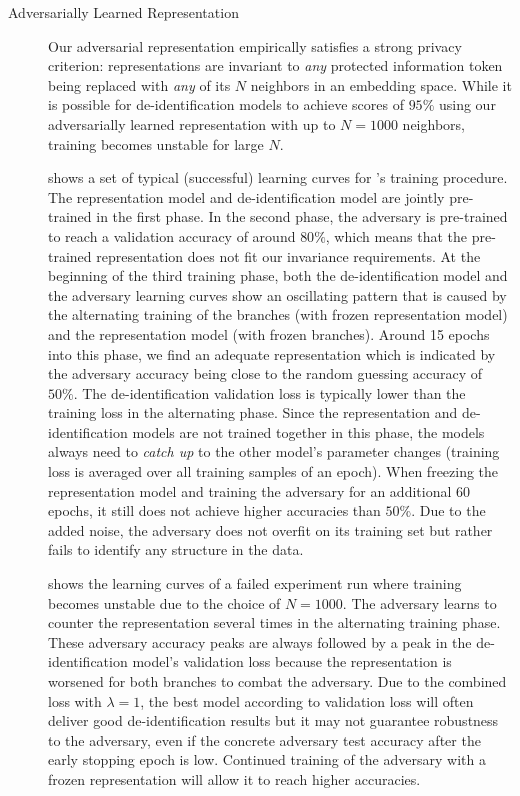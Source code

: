 \begin{description}
    \item[Adversarially Learned Representation]
    Our adversarial representation empirically satisfies a strong privacy criterion: representations are invariant to \textit{any} protected information token being replaced with \textit{any} of its $N$ neighbors in an embedding space.
    While it is possible for de-identification models to achieve \fone scores of $95\%$ using our adversarially learned representation with up to $N=1000$ neighbors, training becomes unstable for large $N$.
    
     shows a set of typical (successful) learning curves for \citeauthor{feutry2018learning}'s training procedure.
    The representation model and de-identification model are jointly pre-trained in the first phase.
    In the second phase, the adversary is pre-trained to reach a validation accuracy of around $80\%$, which means that the pre-trained representation does not fit our invariance requirements.
    At the beginning of the third training phase, both the de-identification model and the adversary learning curves show an oscillating pattern that is caused by the alternating training of the branches (with frozen representation model) and the representation model (with frozen branches).
    Around 15 epochs into this phase, we find an adequate representation which is indicated by the adversary accuracy being close to the random guessing accuracy of $50\%$.
    The de-identification validation loss is typically lower than the training loss in the alternating phase.
    Since the representation and de-identification models are not trained together in this phase, the models always need to \textit{catch up} to the other model's parameter changes (training loss is averaged over all training samples of an epoch).
    When freezing the representation model and training the adversary for an additional $60$ epochs, it still does not achieve higher accuracies than $50\%$.
    Due to the added noise, the adversary does not overfit on its training set but rather fails to identify any structure in the data.
    
     shows the learning curves of a failed experiment run where training becomes unstable due to the choice of $N=1000$.
    The adversary learns to counter the representation several times in the alternating training phase.
    These adversary accuracy peaks are always followed by a peak in the de-identification model's validation loss because the representation is worsened for both branches to combat the adversary.
    Due to the combined loss with $\lambda=1$, the best model according to validation loss will often deliver good de-identification results but it may not guarantee robustness to the adversary, even if the concrete adversary test accuracy after the early stopping epoch is low.
    Continued training of the adversary with a frozen representation will allow it to reach higher accuracies.
    
\end{description}


